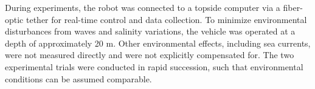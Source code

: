 \documentclass[../main.tex]{subfiles}
\begin{document}
During experiments, the robot was connected to a topside computer via a fiber-optic tether for real-time control and data collection. To minimize environmental disturbances from waves and salinity variations, the vehicle was operated at a depth of approximately 20 m. Other environmental effects, including sea currents, were not measured directly and were not explicitly compensated for. The two experimental trials were conducted in rapid succession, such that environmental conditions can be assumed comparable.
\end{document}
